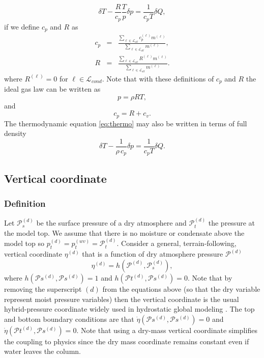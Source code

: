 \documentclass{agujournal}
\begin{document}
{\begin{equation}
\delta T-\frac{R}{c_p}\frac{T}{p}\delta p=\frac{1}{c_p T}\delta Q\label{eq:thermo},
\end{equation}
if we define $c_p$ and $R$ as
\begin{eqnarray}
c_p&=&\frac{\sum_{\ell \in \mathcal{L}_{all}} c_p^{(\ell)}m^{(\ell)}}{\sum_{\ell \in \mathcal{L}_{all}} m^{(\ell)}},\label{eq:cp} \\
R  &=&\frac{\sum_{\ell \in \mathcal{L}_{all}} R^{(\ell)} m^{(\ell)}}{\sum_{\ell \in \mathcal{L}_{all}} m^{(\ell)}}.
\end{eqnarray}
where $R^{(\ell)}=0$ for $\ell \in \mathcal{L}_{cond}$. Note that with these definitions of $c_p$ and $R$ the ideal gas law can be written as
\begin{equation}
p=\rho R T,\label{eq:ig4}
\end{equation}
and 
\begin{equation}
c_p=R+c_v.
\end{equation}
The thermodynamic equation \eqref{eq:thermo} may also be written in terms of full density
\begin{equation}
\delta T-\frac{1}{\rho\, c_p}\delta p=\frac{1}{c_p T}\delta Q\label{eq:thermo2}.
\end{equation}
%
\subsection{Vertical coordinate}\label{eq:vertical_coord}
\subsubsection{Definition}
Let $\mathcal{P}^{(d)}_s$ be the surface pressure of a dry atmosphere  and $\mathcal{P}_t^{(d)}$ the pressure at the model top. We assume that there is no moisture or condensate above the model top so $p_t^{(d)}=p_t^{(wv)}=\mathcal{P}_t^{(d)}$. Consider a general, terrain-following, vertical coordinate $\eta^{(d)}$ that is a function of dry atmosphere pressure $\mathcal{P}^{(d)}$ 
\begin{equation}
\eta^{(d)}=h(\mathcal{P}^{(d)},\mathcal{P}_s^{(d)}),
\end{equation}
where $h(\mathcal{P}s^{(d)},\mathcal{P}s^{(d)})=1$ and $h(\mathcal{P}t^{(d)},\mathcal{P}s^{(d)})=0$. Note that by removing the superscript $(d)$ from the equations above (so that the dry variable represent moist pressure variables) then the vertical coordinate is the usual hybrid-pressure coordinate widely used in hydrostatic global modeling \citep{SB1981MWR}. The top and bottom boundary conditions are that $\dot{\eta}\left({\mathcal{P}s^{(d)},\mathcal{P}s^{(d)}}\right)=0$ and $\dot{\eta}\left( \mathcal{P}t^{(d)},\mathcal{P}s^{(d)}\right)=0$. Note that using a dry-mass vertical coordinate simplifies the coupling to physics since the dry mass coordinate remains constant even if water leaves the column.
}
\end{document}
